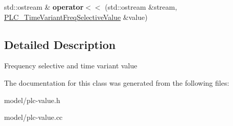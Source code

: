 \begin{DoxyCompactItemize}
\item 
\hypertarget{classns3_1_1PLC__TimeVariantFreqSelectiveValue_a2682685a0585e6ed726681748f3615ac}{std\-::ostream \& {\bfseries operator$<$$<$} (std\-::ostream \&stream, \hyperlink{classns3_1_1PLC__TimeVariantFreqSelectiveValue}{\-P\-L\-C\-\_\-\-Time\-Variant\-Freq\-Selective\-Value} \&value)}\label{classns3_1_1PLC__TimeVariantFreqSelectiveValue_a2682685a0585e6ed726681748f3615ac}

\end{DoxyCompactItemize}


\subsection{\-Detailed \-Description}
\-Frequency selective and time variant value 

\-The documentation for this class was generated from the following files\-:\begin{DoxyCompactItemize}
\item 
model/plc-\/value.\-h\item 
model/plc-\/value.\-cc\end{DoxyCompactItemize}
